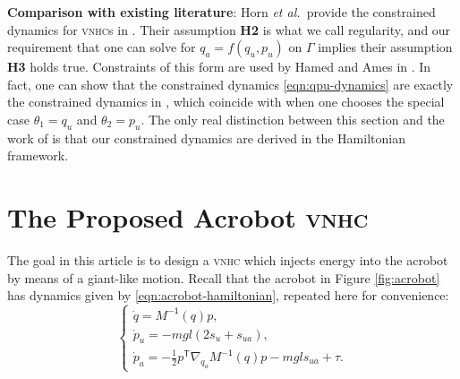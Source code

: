 \documentclass[journal,twoside,web, twocolumn,draftcls]{ieeecolor}
\newtheorem{defn}{Definition} %
\newcommand*{\tpose}{^\mathsf{T}}
\newcommand*{\Minv}{M^\mathsf{-1}}
\newcommand*{\etal}{\MakeLowercase{\textit{et al.~}}}
\newcommand*{\vnhc}{\textsc{vnhc}\xspace}
\newcommand*{\vnhcs}{\textsc{vnhc}s\xspace}
\begin{document}


\textbf{Comparison with existing  literature}: Horn \etal provide the constrained
dynamics for \vnhcs in \cite{nhvc_incline_walking}.
Their assumption \textbf{H2} is what we call regularity, and our requirement
that one can solve for \(q_a = f(q_u,p_u)\) on \(\Gamma\) implies their
assumption \textbf{H3} holds true.
Constraints of this form are used by Hamed and Ames in
\cite{nonholonomic_hybrid_zero_dynamics}.
In fact, one can show that the constrained dynamics \eqref{eqn:qpu-dynamics}
are exactly the constrained dynamics in
\cite[Eqn. (9)]{nonholonomic_hybrid_zero_dynamics}, which coincide with 
\cite[Eqn. (17)]{hybrid_zero_dynamics_bipedal_nhvcs}
when one chooses the special case \(\theta_1 = q_u\) and 
\(\theta_2 = p_u\).
The only real distinction between this section and the work of
\cite{nonholonomic_hybrid_zero_dynamics,hybrid_zero_dynamics_bipedal_nhvcs} is
that our constrained dynamics are derived in the Hamiltonian framework. 

\section{The Proposed Acrobot \vnhc}\label{sec:acrobot}

The goal in this article is to design a \vnhc which injects energy into the
acrobot by means of a giant-like motion.
Recall that the acrobot in Figure \ref{fig:acrobot} has dynamics given by
\eqref{eqn:acrobot-hamiltonian}, repeated here for convenience:
    \begin{equation*}
     \begin{cases}
        \dot{q} = \Minv(q) p 
        ,\\
        \dot{p}_u = -mgl\left(2s_u + s_{ua}\right) 
        ,\\
        \dot{p}_a =-\frac{1}{2}p\tpose \nabla_{q_a}\Minv(q) p
        - mgl s_{ua} + \tau.
    \end{cases}
\end{equation*}
\end{document}
